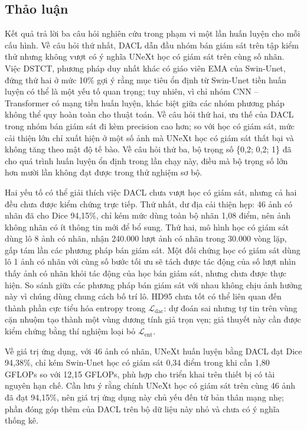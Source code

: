 \documentclass{IEEEtran}
\newcommand{\Lx}[1]{\mathcal{L}_{\mathrm{#1}}}
\begin{document}
\subsection{Thảo luận}

Kết quả trả lời ba câu hỏi nghiên cứu trong phạm vi một lần huấn luyện cho mỗi cấu hình. Về câu hỏi thứ nhất, DACL dẫn đầu nhóm bán giám sát trên tập kiểm thử nhưng không vượt có ý nghĩa UNeXt học có giám sát trên cùng số nhãn. Việc DSTCT, phương pháp duy nhất khác có giáo viên EMA của Swin-Unet, đứng thứ hai ở mức 10\% gợi ý rằng mục tiêu ổn định từ Swin-Unet tiền huấn luyện có thể là một yếu tố quan trọng; tuy nhiên, vì chỉ nhóm CNN -- Transformer có mạng tiền huấn luyện, khác biệt giữa các nhóm phương pháp không thể quy hoàn toàn cho thuật toán. Về câu hỏi thứ hai, ưu thế của DACL trong nhóm bán giám sát đi kèm precision cao hơn; so với học có giám sát, mức cải thiện lớn chỉ xuất hiện ở một số ảnh mà UNeXt học có giám sát thất bại và không tăng theo mật độ tế bào. Về câu hỏi thứ ba, bộ trọng số \{0,2; 0,2; 1\} đã cho quá trình huấn luyện ổn định trong lần chạy này, điều mà bộ trọng số lớn hơn mười lần không đạt được trong thử nghiệm sơ bộ.

Hai yếu tố có thể giải thích việc DACL chưa vượt học có giám sát, nhưng cả hai đều chưa được kiểm chứng trực tiếp. Thứ nhất, dư địa cải thiện hẹp: 46 ảnh có nhãn đã cho Dice 94,15\%, chỉ kém mức dùng toàn bộ nhãn 1,08 điểm, nên ảnh không nhãn có ít thông tin mới để bổ sung. Thứ hai, mô hình học có giám sát dùng lô 8 ảnh có nhãn, nhận 240.000 lượt ảnh có nhãn trong 30.000 vòng lặp, gấp tám lần các phương pháp bán giám sát. Một đối chứng học có giám sát dùng lô 1 ảnh có nhãn với cùng số bước tối ưu sẽ tách được tác động của số lượt nhìn thấy ảnh có nhãn khỏi tác động của học bán giám sát, nhưng chưa được thực hiện. So sánh giữa các phương pháp bán giám sát với nhau không chịu ảnh hưởng này vì chúng dùng chung cách bố trí lô. HD95 chưa tốt có thể liên quan đến thành phần cực tiểu hóa entropy trong $\Lx{dac}$: dự đoán sai nhưng tự tin trên vùng cặn nhuộm tạo thành một vùng dương tính giả trọn vẹn; giả thuyết này cần được kiểm chứng bằng thí nghiệm loại bỏ $\Lx{ent}$.

Về giá trị ứng dụng, với 46 ảnh có nhãn, UNeXt huấn luyện bằng DACL đạt Dice 94,38\%, chỉ kém Swin-Unet học có giám sát 0,34 điểm trong khi cần 1,80 GFLOPs so với 12,15 GFLOPs, phù hợp cho triển khai trên thiết bị có tài nguyên hạn chế. Cần lưu ý rằng chính UNeXt học có giám sát trên cùng 46 ảnh đã đạt 94,15\%, nên giá trị ứng dụng này chủ yếu đến từ bản thân mạng nhẹ; phần đóng góp thêm của DACL trên bộ dữ liệu này nhỏ và chưa có ý nghĩa thống kê.
\end{document}
